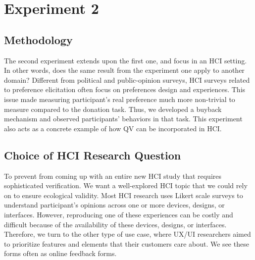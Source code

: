 \section{Experiment 2}
\subsection{Methodology} \label{method-2}
The second experiment extends upon the first one, and focus in an HCI setting.
In other words, does the same result from the experiment one apply to another domain?
Different from political and public-opinion surveys, HCI surveys related to preference elicitation often focus on preferences design and experiences.
This issue made measuring participant's real preference much more non-trivial to measure compared to the donation task.
Thus, we developed a buyback mechanism and observed participants' behaviors in that task.
This experiment also acts as a concrete example of how QV can be incorporated in HCI.

\subsection{Choice of HCI Research Question}
To prevent from coming up with an entire new HCI study that requires sophisticated verification.
We want a well-explored HCI topic that we could rely on to ensure ecological validity.
Most HCI research uses Likert scale surveys to understand participant's opinions across one or more devices, designs, or interfaces.
However, reproducing one of these experiences can be costly and difficult because of the availability of these devices, designs, or interfaces.
Therefore, we turn to the other type of use case, where UX/UI researchers aimed to prioritize features and elements that their customers care about.
We see these forms often as online feedback forms.

